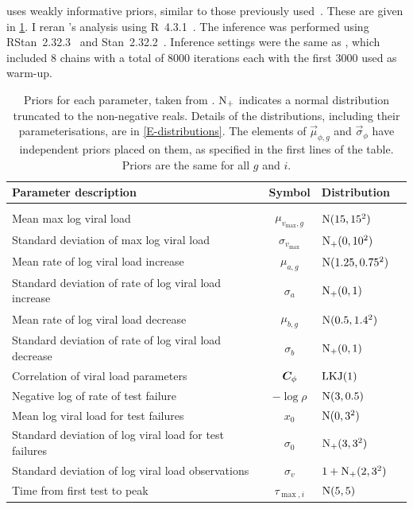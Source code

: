 \documentclass[thesis.tex]{subfiles}
\begin{document}
\textcite{hakkiOnset} uses weakly informative priors, similar to those previously used~\autocite{singanayagamCommunity}.
These are given in \cref{ATACCC:table:hakki-priors}.
I reran \textcite{hakkiOnset}'s analysis using R~4.3.1~\autocite{R-4-3-1}.
The inference was performed using RStan~2.32.3~\autocite{RStan-2-32-3} and Stan~2.32.2~\autocite{Stan-2-32-2}.
Inference settings were the same as \textcite{hakkiOnset}, which included 8 chains with a total of 8000 iterations each with the first 3000 used as warm-up.
\begin{table}
\begin{tabular}{l c l l}
    Parameter description & Symbol & Distribution \\
    \hline \\
    Mean max log viral load & $\mu_{v_\text{max}, g}$ & $\operatorname{N}(15, 15^2)$ \\
    Standard deviation of max log viral load & $\sigma_{v_\text{max}}$ & $\operatorname{N}_+(0, 10^2)$ \\
    Mean rate of log viral load increase & $\mu_{a, g}$ & $\operatorname{N}(1.25, 0.75^2)$ \\
    Standard deviation of rate of log viral load increase & $\sigma_{a}$ & $\operatorname{N}_+(0, 1)$ \\
    Mean rate of log viral load decrease & $\mu_{b, g}$ & $\operatorname{N}(0.5, 1.4^2)$ \\
    Standard deviation of rate of log viral load decrease & $\sigma_{b}$ & $\operatorname{N}_+(0, 1)$ \\
    Correlation of viral load parameters & $\bm{C}_\phi$ & $\operatorname{LKJ}(1)$ \\
    Negative log of rate of test failure & $-\log \rho$ & $\operatorname{N}(3, 0.5)$ \\
    Mean log viral load for test failures & $x_0$ & $\operatorname{N}(0, 3^2)$ \\
    Standard deviation of log viral load for test failures & $\sigma_0$ & $\operatorname{N}_+(3, 3^2)$ \\
    Standard deviation of log viral load observations & $\sigma_v$ & $1 + \operatorname{N}_+(2, 3^2)$ \\
    Time from first test to peak & $\tau_{\max,i}$ & $\operatorname{N}(5,5)$
\end{tabular}
\caption[Viral load model priors]{Priors for each parameter, taken from \textcite{hakkiOnset}. $\operatorname{N}_+$ indicates a normal distribution truncated to the non-negative reals. Details of the distributions, including their parameterisations, are in \cref{E-distributions}. The elements of $\vec{\mu}_{\phi,g}$ and $\vec{\sigma}_\phi$ have independent priors placed on them, as specified in the first lines of the table. Priors are the same for all $g$ and $i$. \label{ATACCC:table:hakki-priors}}
\end{table}
\end{document}
